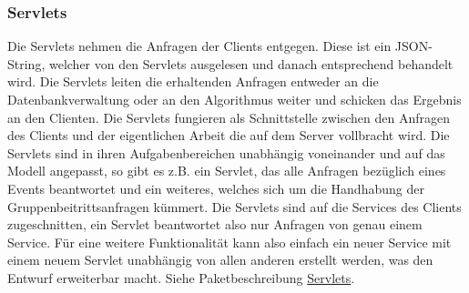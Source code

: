 \begin {center}
\end {center}
\newpage
	\subsubsection{Servlets}

	Die Servlets nehmen die Anfragen der Clients entgegen. Diese ist ein JSON-String, welcher von den Servlets ausgelesen und danach entsprechend behandelt wird. Die Servlets leiten die erhaltenden Anfragen entweder an die Datenbankverwaltung oder an den Algorithmus weiter und schicken das Ergebnis an den Clienten.
Die Servlets fungieren als Schnittstelle zwischen den Anfragen des Clients und der eigentlichen Arbeit die auf dem Server vollbracht wird. 
Die Servlets sind in ihren Aufgabenbereichen unabhängig voneinander und auf das Modell angepasst, so gibt es z.B. ein Servlet, das alle Anfragen bezüglich eines Events beantwortet und ein weiteres, welches sich um die Handhabung der Gruppenbeitrittsanfragen kümmert.
Die Servlets sind auf die Services des Clients zugeschnitten, ein Servlet beantwortet also nur Anfragen von genau einem Service.
Für eine weitere Funktionalität kann also einfach ein neuer Service mit einem neuem Servlet unabhängig von allen anderen erstellt werden, was den Entwurf erweiterbar macht.   
\newline
Siehe Paketbeschreibung \hyperlink{servlet}{Servlets}.

